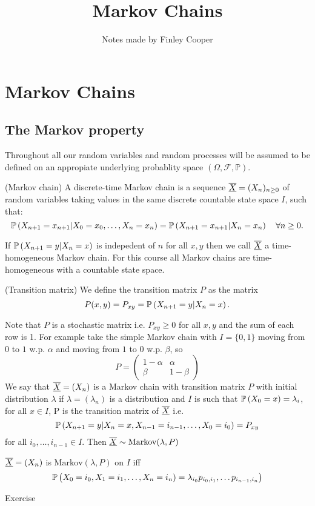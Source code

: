 \documentclass{article}
\title{Markov Chains}
\author{Notes made by Finley Cooper}
\begin{document}
  \maketitle
  \newpage
  \tableofcontents
  \newpage
  \section{Markov Chains}
  \subsection{The Markov property}
  Throughout all our random variables and random processes will be assumed to be defined on an appropiate underlying probablity space $ (\Omega, \mathcal F, \mathbb P) $.
  \begin{definition}
  (Markov chain) A discrete-time Markov chain is a sequence $ \underline{\overline{X}}=(X_n)_{n\ge 0} $ of random variables taking values in the same discrete countable state space $ I $, such that:
	  \[
		  \mathbb{P}\left({X_{n+1}=x_{n+1}|X_0=x_0,\dots, X_n=x_n}\right)=\mathbb{P}\left({X_{n+1}=x_{n+1}|X_n=x_n}\right)\quad \forall n\ge 0.
	  \]
  \end{definition}
  If $ \mathbb{P}\left({X_{n+1} = y | X_n = x}\right) $ is indepedent of $ n $ for all $ x,y $ then we call $ \underline{\overline{X}} $ a time-homogeneous Markov chain. For this course all Markov chains are time-homogeneous with a countable state space.\par
\begin{definition}
	(Transition matrix) We define the transition matrix $ P $ as the matrix
	\[
		P(x,y)=P_{xy}=\mathbb{P}\left({X_{n+1}=y|X_n=x}\right).
	\]
\end{definition}
Note that $ P $ is a stochastic matrix i.e. $ P_{xy}\ge 0  $ for all $ x,y $ and the sum of each row is 1.
For example take the simple Markov chain with $ I=\{0,1\} $ moving from $ 0 $ to $ 1 $ w.p. $ \alpha $ and moving from $ 1 $ to $ 0 $ w.p. $ \beta $,
so \[P = 
  \begin{pmatrix}
	  1-\alpha & \alpha \\
	  \beta & 1-\beta 
  \end{pmatrix}
\]
We say that $ \underline{\overline{X}}= (X_n) $ is a Markov chain with transition matrix $ P $ with initial distribution $ \lambda $ if $ \lambda=(\lambda_n) $ is a distribution and $ I $ is such that $ \mathbb{P}\left({X_0=x}\right)=\lambda_i $, for all $ x\in I $, P is the transition matrix of $ \underline{\overline{X}} $ i.e.
\[
	\mathbb{P}\left({X_{n+1}=y|X_n=x,X_{n-1}=i_{n-1},\dots, X_0=i_0}\right)=P_{xy}
\]
for all $ i_0,\dots, i_{n-1}\in I $. Then $ \underline{\overline{X}}\sim \text{Markov}(\lambda, P) $
\begin{theorem}
$ \underline{\overline{X}} = (X_n)$ is $ \text{Markov}(\lambda, P) $ on $ I $ iff
\[
\mathbb{P}\left({X_0=i_0,X_1=i_1,\dots, X_n=i_n)=\lambda_{i_0}p_{i_0,i_1},\dots p_{i_{n-1},i_n}}\right)
\]
\end{theorem} 
\pf Exercise
\end{document}
